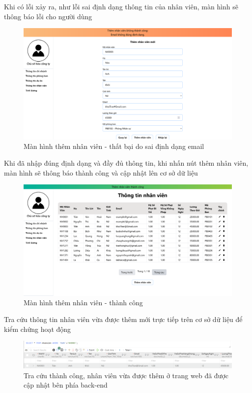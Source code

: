 Khi có lỗi xảy ra, như lỗi sai định dạng thông tin của nhân viên, màn hình sẽ thông báo lỗi cho người dùng
\begin{figure}[H]
    \centering
    \includegraphics[width=0.75\linewidth]{content/images/ManHinh_1_b.png}
    \caption{Màn hình thêm nhân viên - thất bại do sai định dạng email}
    \label{fig:ManHinh_1_b}
\end{figure}

Khi đã nhập đúng định dạng và đầy đủ thông tin, khi nhấn nút thêm nhân viên, màn hình sẽ thông báo thành công và cập nhật lên cơ sở dữ liệu
\begin{figure}[H]
    \centering
    \includegraphics[width=0.75\linewidth]{content/images/ManHinh_1_c.png}
    \caption{Màn hình thêm nhân viên - thành công}
    \label{fig:ManHinh_1_c}
\end{figure}


Tra cứu thông tin nhân viên vừa được thêm mới trực tiếp trên cơ sở dữ liệu để kiểm chứng hoạt động
\begin{figure}[H]
    \centering
    \includegraphics[width=0.75\linewidth]{content/images/ManHinh_1_d.png}
    \caption{Tra cứu thành công, nhân viên vừa được thêm ở trang web đã được cập nhật bên phía back-end}
    \label{fig:ManHinh_1_d}
\end{figure}


